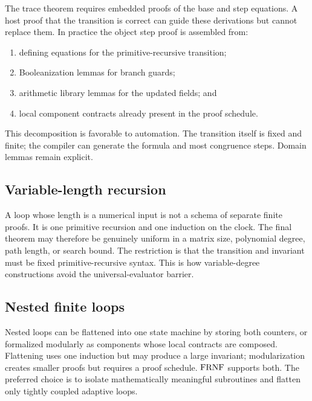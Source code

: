 The trace theorem requires embedded proofs of the base and step equations.  A host
proof that the transition is correct can guide these derivations but cannot replace
them.  In practice the object step proof is assembled from:

\begin{enumerate}[label=(\roman*),leftmargin=2.4em]
\item defining equations for the primitive-recursive transition;
\item Booleanization lemmas for branch guards;
\item arithmetic library lemmas for the updated fields; and
\item local component contracts already present in the proof schedule.
\end{enumerate}

This decomposition is favorable to automation.  The transition itself is fixed and
finite; the compiler can generate the formula and most congruence steps.  Domain
lemmas remain explicit.

\subsection{Variable-length recursion}

A loop whose length is a numerical input is not a schema of separate finite proofs.
It is one primitive recursion and one induction on the clock.  The final theorem may
therefore be genuinely uniform in a matrix size, polynomial degree, path length, or
search bound.  The restriction is that the transition and invariant must be fixed
primitive-recursive syntax.  This is how variable-degree constructions avoid the
universal-evaluator barrier.

\subsection{Nested finite loops}

Nested loops can be flattened into one state machine by storing both counters, or
formalized modularly as components whose local contracts are composed.  Flattening
uses one induction but may produce a large invariant; modularization creates smaller
proofs but requires a proof schedule.  \(\mathrm{FRNF}\) supports both.  The preferred choice
is to isolate mathematically meaningful subroutines and flatten only tightly coupled
adaptive loops.
